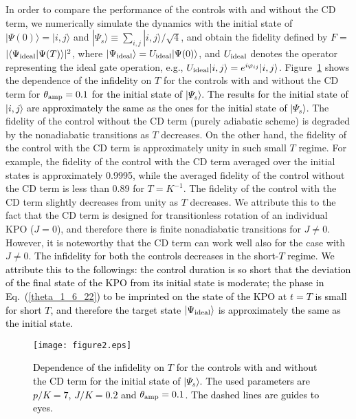 \documentclass[%
 reprint,
 amsmath,amssymb,
 aps,
pra,
]{revtex4-2}
\begin{document}
In order to compare the performance of the controls with and without the CD term,
we numerically simulate the dynamics with the initial state of $|\Psi(0)\rangle=|i,j\rangle$ and $|\Psi_s\rangle\equiv\sum_{i,j}|i,j\rangle/\sqrt{4}$, and obtain the fidelity  defined by \textcolor{black}{$F=$}$|\langle \Psi_{\rm ideal} | \Psi(T)\rangle|^2$, where $|\Psi_{\rm ideal}\rangle=U_{\rm ideal}|\Psi(0)\rangle$, and $U_{\rm ideal}$ denotes the operator representing the ideal gate operation, e.g., $U_{\rm ideal}|i,j\rangle =  e^{i\varphi_{ij}}|i,j\rangle$.
Figure~\ref{fid_T_1_12_22} shows the dependence of the \textcolor{black}{infidelity} on $T$ for the controls with and without the CD term for $\theta_{\rm amp}=0.1$ \textcolor{black}{for the initial state of $|\Psi_s\rangle$}. 
\textcolor{black}{ The results for the initial state of $|i,j\rangle$ are approximately the same as the ones for the initial state of $|\Psi_s\rangle$.}
The fidelity of the control without the CD term (purely adiabatic scheme) is degraded by the nonadiabatic transitions as $T$ decreases. 
On the other hand, the fidelity of the control with the CD term is approximately unity in such small $T$ regime.
For example, the fidelity of the control with the CD term averaged over the initial states is approximately 0.9995, while the averaged fidelity of the control without the CD term is less than 0.89 for $T=K^{-1}$.
The fidelity of the control with the CD term slightly decreases from unity as $T$ decreases. 
We attribute this to the fact that the CD term is designed for transitionless rotation of an individual KPO ($J=0$), and therefore there is finite nonadiabatic transitions for $J\ne 0$.
However, it is noteworthy that the CD term can work well also for the case with $J\ne 0$.
\textcolor{black}{
The infidelity for both the controls decreases in the short-$T$ regime. 
We attribute this to the followings: the control duration is so short that the deviation of the final state of the KPO from its initial state is moderate; the phase in Eq.~(\ref{theta_1_6_22}) to be imprinted on the state of the KPO at $t=T$ is small for short $T$, and therefore the target state $|\Psi_{\rm ideal}\rangle$ is approximately the same as the initial state.}

\begin{figure}[h!]
\begin{center}
\texttt{[image: figure2.eps]}
\end{center}
\caption{
\textcolor{black}{Dependence of the infidelity on $T$ for the controls with and without the CD term for the initial state of $|\Psi_s\rangle$.
The used parameters are $p/K=7$, $J/K=0.2$ and $\theta_{\rm amp}=0.1$.
The dashed lines are guides to eyes.
}
}
\label{fid_T_1_12_22}
\end{figure}
\end{document}
